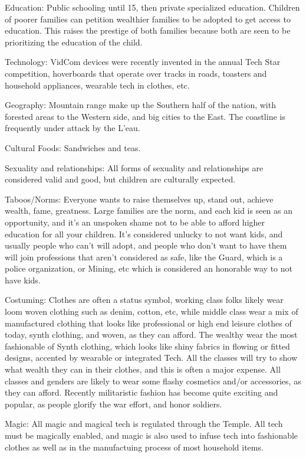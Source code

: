 \documentclass[blue]{GL2020}
\begin{document}
Education:	Public schooling until 15, then private specialized education.  Children of poorer families can petition wealthier families to be adopted to get access to education. This raises the prestige of both families because both are seen to be prioritizing the education of the child.

Technology:		VidCom devices were recently invented in the annual Tech Star competition, hoverboards that operate over tracks in roads, toasters and household appliances, wearable tech in clothes, etc.  

Geography:	Mountain range make up the Southern half of the nation, with forested areas to the Western side, and big cities to the East. The coastline is frequently under attack by the L'eau.

Cultural Foods:	Sandwiches and teas.

Sexuality and relationships:	All forms of sexuality and relationships are considered valid and good, but children are culturally expected.

Taboos/Norms:		Everyone wants to raise themselves up, stand out, achieve wealth, fame, greatness.  Large families are the norm, and each kid is seen as an opportunity, and it's an unspoken shame not to be able to afford higher education for all your children.  It's considered unlucky to not want kids, and usually people who can't will adopt, and people who don't want to have them will join professions that aren't considered as safe, like the Guard, which is a police organization, or Mining, etc which is considered an honorable way to not have kids.

Costuming:		Clothes are often a status symbol, working class folks likely wear loom woven clothing such as denim, cotton, etc, while middle class wear a mix of manufactured clothing that looks like professional or high end leisure clothes of today, synth clothing, and woven, as they can afford.  The wealthy wear the most fashionable of Synth clothing, which looks like shiny fabrics in flowing or fitted designs, accented by wearable or integrated Tech.  All the classes will try to show what wealth they can in their clothes, and this is often a major expense.  All classes and genders are likely to wear some flashy cosmetics and/or accessories, as they can afford.  Recently militaristic fashion has become quite exciting and popular, as people glorify the war effort, and honor soldiers.

Magic:	All magic and magical tech is regulated through the Temple.  All tech must be magically enabled, and
magic is also used to infuse tech into fashionable clothes as well as in the manufactuing process of most household items.
									
\end{document}
